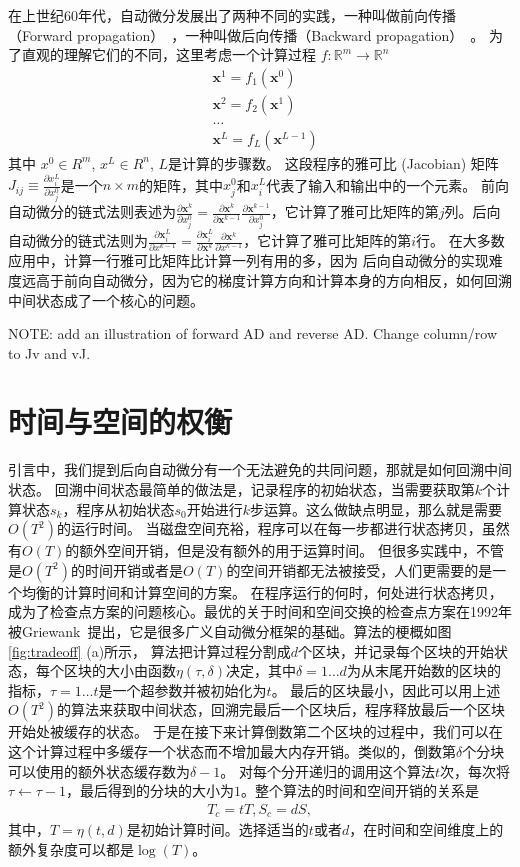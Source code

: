 \documentclass[A4,twoside,fontset=ubuntu,UTF8]{ctexart}
\newcommand{\vx}{{\mathbf{x}}}
\begin{document}
    在上世纪60年代，自动微分发展出了两种不同的实践，一种叫做前向传播（Forward propagation）~\cite{Wengert1964}，一种叫做后向传播（Backward propagation）~\cite{Boltyanski1960}。
为了直观的理解它们的不同，这里考虑一个计算过程 $f : \mathbb{R}^m \rightarrow \mathbb{R}^n$
\begin{align*}
    &\vx^1 = f_1(\vx^0)\\
    &\vx^2 = f_2(\vx^1)\\
    &\ldots\\
    &\vx^L = f_L(\vx^{L-1})
\end{align*}
其中 $x^0\in R^m$, $x^L\in R^n$, $L$是计算的步骤数。
这段程序的雅可比 (Jacobian) 矩阵$J_{ij} \equiv \frac{\partial x^L_i}{\partial x_j^0}$是一个$n\times m$的矩阵，其中$x_j^0$和$x_i^L$代表了输入和输出中的一个元素。
前向自动微分的链式法则表述为$\frac{\partial \vx^k}{\partial x^0_j} = \frac{\partial \vx^k}{\partial \vx^{k-1}}\frac{\partial \vx^{k-1}}{\partial x^0_j}$，它计算了雅可比矩阵的第$j$列。后向自动微分的链式法则为$\frac{\partial \vx^L_i}{\partial x^{k-1}} = \frac{\partial \vx^L_i}{\partial \vx^{k}}\frac{\partial \vx^{k}}{\partial x^{k-1}}$，它计算了雅可比矩阵的第$i$行。
在大多数应用中，计算一行雅可比矩阵比计算一列有用的多，因为
后向自动微分的实现难度远高于前向自动微分，因为它的梯度计算方向和计算本身的方向相反，如何回溯中间状态成了一个核心的问题。

NOTE: add an illustration of forward AD and reverse AD. Change column/row to Jv and vJ.

\section{时间与空间的权衡}\label{sec:timespace}

引言中，我们提到后向自动微分有一个无法避免的共同问题，那就是如何回溯中间状态。
回溯中间状态最简单的做法是，记录程序的初始状态，当需要获取第$k$个计算状态$s_k$，程序从初始状态$s_0$开始进行$k$步运算。这么做缺点明显，那么就是需要$O(T^2)$的运行时间。
当磁盘空间充裕，程序可以在每一步都进行状态拷贝，虽然有$O(T)$的额外空间开销，但是没有额外的用于运算时间。
但很多实践中，不管是$O(T^2)$的时间开销或者是$O(T)$的空间开销都无法被接受，人们更需要的是一个均衡的计算时间和计算空间的方案。
    在程序运行的何时，何处进行状态拷贝，成为了检查点方案的问题核心。最优的关于时间和空间交换的检查点方案在1992年被Griewank~\cite{Griewank1992}提出，它是很多广义自动微分框架的基础。算法的梗概如图\ref{fig:tradeoff} (a)所示，
    算法把计算过程分割成$d$个区块，并记录每个区块的开始状态，每个区块的大小由函数$\eta(\tau, \delta)$决定，其中$\delta=1\ldots d$为从末尾开始数的区块的指标，$\tau = 1\ldots t$是一个超参数并被初始化为$t$。
最后的区块最小，因此可以用上述$O(T^2)$的算法来获取中间状态，回溯完最后一个区块后，程序释放最后一个区块开始处被缓存的状态。
于是在接下来计算倒数第二个区块的过程中，我们可以在这个计算过程中多缓存一个状态而不增加最大内存开销。类似的，倒数第$\delta$个分块可以使用的额外状态缓存数为$\delta-1$。
对每个分开递归的调用这个算法$t$次，每次将$\tau\leftarrow \tau-1$，最后得到的分块的大小为$1$。整个算法的时间和空间开销的关系是
\begin{align}
    T_c = tT, S_c = dS,
\end{align}
其中，$T = \eta(t, d)$是初始计算时间。选择适当的$t$或者$d$，在时间和空间维度上的额外复杂度可以都是$\log(T)$。
\end{document}

